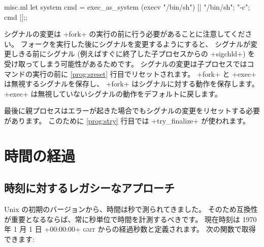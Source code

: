 \begin{example}
\begin{listingcodefile}[style=numbers]{misc.ml}
let system cmd =
  exec_as_system (execv "/bin/sh") [| "/bin/sh"; "-c"; cmd |];;
\end{listingcodefile}
%
シグナルの変更は \ml+fork+ の実行の前に行う必要があることに注意してください。
フォークを実行した後にシグナルを変更するようにすると、
シグナルが変更しきる前にシグナル (例えばすぐに終了した子プロセスからの \ml+sigchld+) を受け取ってしまう可能性があるためです。
シグナルの変更は子プロセスではコマンドの実行の前に \ref{prog:sreset} 行目でリセットされます。
\ml+fork+ と \ml+exec+ は無視するシグナルを保存し、 \ml+fork+ はシグナルに対する動作を保存します。
\ml+exec+ は無視していないシグナルの動作をデフォルトに戻します。

最後に親プロセスはエラーが起きた場合でもシグナルの変更をリセットする必要があります。
このために \ref{prog:stry} 行目では \ml+try_finalize+ が使われます。
\end{example}


\section{時間の経過}

\subsection*{時刻に対するレガシーなアプローチ}

Unix の初期のバージョンから、時間は秒で測られてきました。
そのため互換性が重要となるならば、常に秒単位で時間を計測するべきです。
現在時刻は 1970 年 1 月 1 日 \ml+00:00:00+ \textsc{gmt} からの経過秒数と定義されます。
次の関数で取得できます:

